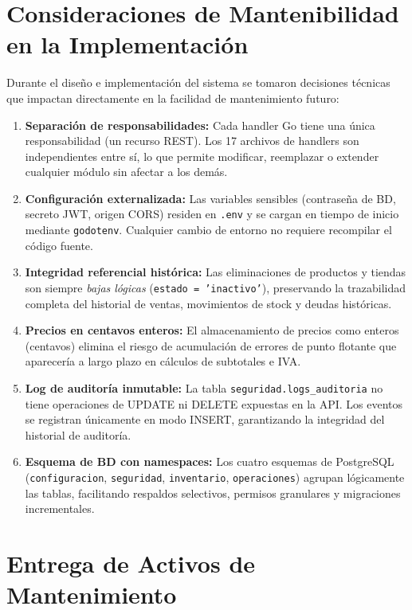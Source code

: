 \documentclass[12pt,a4paper,oneside]{report}
\begin{document}
\section{Consideraciones de Mantenibilidad en la Implementación}

Durante el diseño e implementación del sistema se tomaron decisiones técnicas que impactan directamente en la facilidad de mantenimiento futuro:

\begin{enumerate}[leftmargin=1.5cm, label=\textbf{MC\arabic*.}]
  \item \textbf{Separación de responsabilidades:} Cada handler Go tiene una única responsabilidad (un recurso REST). Los 17 archivos de handlers son independientes entre sí, lo que permite modificar, reemplazar o extender cualquier módulo sin afectar a los demás.
  \item \textbf{Configuración externalizada:} Las variables sensibles (contraseña de BD, secreto JWT, origen CORS) residen en \texttt{.env} y se cargan en tiempo de inicio mediante \texttt{godotenv}. Cualquier cambio de entorno no requiere recompilar el código fuente.
  \item \textbf{Integridad referencial histórica:} Las eliminaciones de productos y tiendas son siempre \textit{bajas lógicas} (\texttt{estado = 'inactivo'}), preservando la trazabilidad completa del historial de ventas, movimientos de stock y deudas históricas.
  \item \textbf{Precios en centavos enteros:} El almacenamiento de precios como enteros (centavos) elimina el riesgo de acumulación de errores de punto flotante que aparecería a largo plazo en cálculos de subtotales e IVA.
  \item \textbf{Log de auditoría inmutable:} La tabla \texttt{seguridad.logs\_auditoria} no tiene operaciones de UPDATE ni DELETE expuestas en la API. Los eventos se registran únicamente en modo INSERT, garantizando la integridad del historial de auditoría.
  \item \textbf{Esquema de BD con namespaces:} Los cuatro esquemas de PostgreSQL (\texttt{configuracion}, \texttt{seguridad}, \texttt{inventario}, \texttt{operaciones}) agrupan lógicamente las tablas, facilitando respaldos selectivos, permisos granulares y migraciones incrementales.
\end{enumerate}

\section{Entrega de Activos de Mantenimiento}
\end{document}
